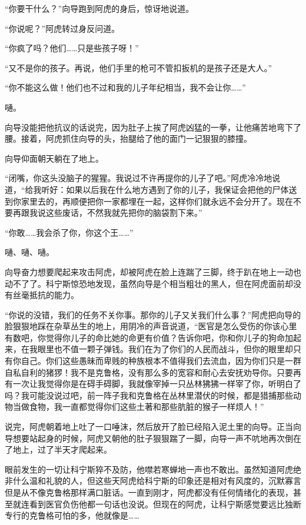 “你要干什么？”向导跑到阿虎的身后，惊讶地说道。

“你说呢？”阿虎转过身反问道。

“你疯了吗？他们……只是些孩子呀！”

“又不是你的孩子。再说，他们手里的枪可不管扣扳机的是孩子还是大人。”

“你不能这么做！他们也不过和我的儿子年纪相当，我不会让你……”

嗵。

向导没能把他抗议的话说完，因为肚子上挨了阿虎凶猛的一拳，让他痛苦地弯下了腰。接着，阿虎抓住向导的头，抬腿给了他的面门一记狠狠的膝撞。

向导仰面朝天躺在了地上。

“闭嘴，你这头没脑子的猩猩。我说过不许再提你的儿子了吧。”阿虎冷冷地说道，“给我听好：如果以后我在什么地方遇到了你的儿子，我保证会把他的尸体送到你家里去的，再顺便把你一家都埋在一起，这样你们就永远不会分开了。现在不要再跟我说这些废话，不然我就先把你的脑袋割下来。”

“你敢……我会杀了你，你这个王……”

嗵、嗵、嗵。

向导奋力想要爬起来攻击阿虎，却被阿虎在脸上连踹了三脚，终于趴在地上一动也动不了了。科宁斯惊恐地发现，虽然向导是个相当粗壮的黑人，但在阿虎面前却没有丝毫抵抗的能力。

“你说的没错，我们的任务不关你事。那你的儿子又关我们什么事？”阿虎把向导的脸狠狠地踩在杂草丛生的地上，用阴冷的声音说道，“医官是怎么受伤的你该心里有数吧，你觉得你儿子的命比她的命更有价值？告诉你吧，你和你儿子的狗命加起来，在我眼里也不值一颗子弹钱。我们在为了你们的人民而战斗，但你的眼里却只有你自己。你们这些愚昧而卑贱的种族根本不值得我们去流血，因为你们只是一群自私自利的猪猡！我不是克鲁格，没有那么多的宽容和耐心去安抚劝导你。只要再有一次让我觉得你是在碍手碍脚，我就像宰掉一只丛林狒狒一样宰了你，听明白了吗？我可能没说过吧，前一阵子我和克鲁格在丛林里潜伏的时候，都是猎捕那些动物当做食物，我一直都觉得你们这些土著和那些肮脏的猴子一样烦人！”

说完，阿虎朝着地上吐了一口唾沫，然后放开了脸已经陷入泥土里的向导。正当向导想要站起身的时候，阿虎又朝他的肚子狠狠踹了一脚，向导一声不吭地再次倒在了地上，过了半天才爬起来。

眼前发生的一切让科宁斯猝不及防，他噤若寒蝉地一声也不敢出。虽然知道阿虎绝非什么温和礼貌的人，但这些天阿虎给科宁斯的印象还是相对有风度的，沉默寡言但是从不像克鲁格那样满口脏话。一直到刚才，阿虎都没有任何情绪化的表现，甚至就连看到医官负伤他都一句话也没说。但现在的阿虎，让科宁斯感觉要远比独断专行的克鲁格可怕的多，他就像是……

